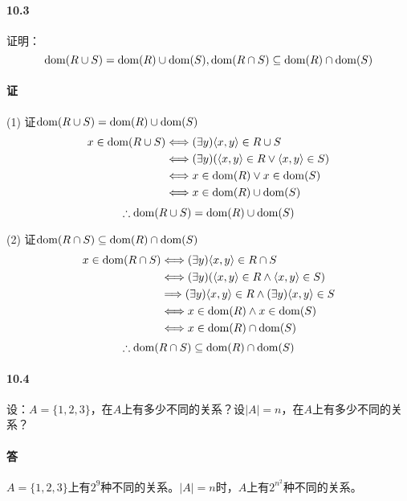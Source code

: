 \documentclass[UTF8]{ctexart}
\newcommand{\dom}{{\rm dom}}
\begin{document}
\paragraph{10.3}\label{10.3}
证明：
$$\dom(R \cup S) = \dom(R) \cup \dom(S), \dom(R \cap S)\subseteq \dom(R) \cap \dom(S)$$

\paragraph{证}
(1) 证$\dom(R \cup S) = \dom(R) \cup \dom(S)$
\begin{align*}
    x \in \dom(R \cup S) & \Longleftrightarrow ( \exists y) \langle x,y \rangle \in R \cup S \\
    & \Longleftrightarrow ( \exists y) (\langle x,y \rangle \in R \lor \langle x,y \rangle \in S) \\
    & \Longleftrightarrow x \in \dom(R) \lor x \in \dom(S) \\
    & \Longleftrightarrow x \in \dom(R) \cup \dom(S)
\end{align*}
$$\therefore \dom(R \cup S) = \dom(R) \cup \dom(S)$$

(2) 证$\dom(R \cap S)\subseteq \dom(R) \cap \dom(S)$
\begin{align*}
    x \in \dom(R \cap S) & \Longleftrightarrow ( \exists y) \langle x,y \rangle \in R \cap S \\
    & \Longleftrightarrow ( \exists y)( \langle x,y \rangle \in R \land \langle x,y \rangle \in S) \\
    & \Longrightarrow ( \exists y) \langle x,y \rangle \in R \land ( \exists y) \langle x,y \rangle \in S \\
    & \Longleftrightarrow x \in \dom(R) \land x \in \dom(S) \\
    & \Longleftrightarrow x \in \dom(R) \cap \dom(S)
\end{align*}
$$\therefore \dom(R \cap S)\subseteq \dom(R) \cap \dom(S)$$

\paragraph{10.4}\label{10.4}
设：$A=\{1,2,3\}$，在$A$上有多少不同的关系？设$|A|=n$，在$A$上有多少不同的关系？

\paragraph{答} $A=\{1,2,3\}$上有$2^9$种不同的关系。$|A|=n$时，$A$上有$2^{n^2}$种不同的关系。
\end{document}
